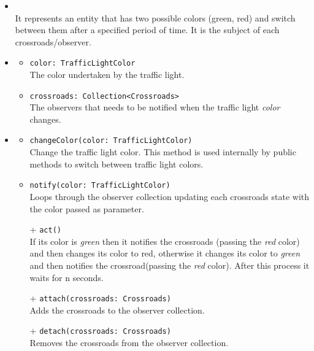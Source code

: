 \begin{itemize}
  \item \textbf{\descr} \\
    It represents an entity that has two possible colors (green, red) and switch
between them after a specified period of time. It is the subject of each 
crossroads/observer.
  \item \textbf{\attrs}
  \begin{itemize}
    \item \texttt{color: TrafficLightColor} \\
The color undertaken by the traffic light.
    \item \texttt{crossroads: Collection<Crossroads>} \\
The observers that needs to be notified when the traffic light \textit{color} 
changes.
  \end{itemize}
  \item \textbf{\ops}
  \begin{itemize}
    \item \texttt{changeColor(color: TrafficLightColor)} \\
Change the traffic light color. This method is used internally by public methods to 
switch between traffic light colors.
    \item \texttt{notify(color: TrafficLightColor)} \\
Loops through the observer collection updating each crossroads state with the 
color passed as parameter. 
    \item[+] \texttt{act()} \\
If its color is \textit{green} then it notifies the crossroads 
(passing the \textit{red} color) and then changes its color to red, 
otherwise it changes its color to \textit{green} and then notifies 
the crossroad(passing the \textit{red} color).
After this process it waits for n seconds.
    \item[+] \texttt{attach(crossroads: Crossroads)} \\
Adds the crossroads to the observer collection.
    \item[+] \texttt{detach(crossroads: Crossroads)} \\
Removes the crossroads from the observer collection.
  \end{itemize}
\end{itemize}
